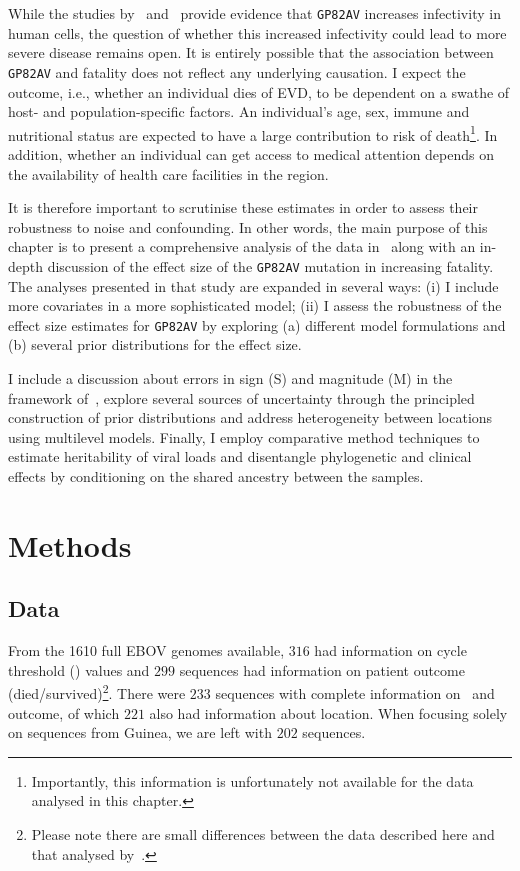 While the studies by~\cite{Urbanowicz2016} and~\cite{Diehl2016} provide evidence that \verb|GP82AV| increases infectivity in human cells, the question of whether this increased infectivity could lead to more severe disease remains open.
It is entirely possible that the association between \verb|GP82AV| and fatality does not reflect any underlying causation.
I expect the outcome, i.e., whether an individual dies of EVD, to be dependent on a swathe of host- and population-specific factors.
An individual's age, sex, immune and nutritional status are expected to have a large contribution to risk of death\footnote{Importantly, this information is unfortunately not available for the data analysed in this chapter.}.
In addition, whether an individual can get access to medical attention depends on the availability of health care facilities in the region.

It is therefore important to scrutinise these estimates in order to assess their robustness to noise and confounding.
In other words, the main purpose of this chapter is to present a comprehensive analysis of the data in~\cite{Diehl2016} along with an in-depth discussion of the effect size of  the \verb|GP82AV| mutation in increasing fatality.
The analyses presented in that study are expanded in several ways: (i) I include more covariates in a more sophisticated model; (ii) I assess the robustness of the effect size estimates for \verb|GP82AV| by exploring (a) different model formulations and (b) several prior distributions for the effect size.

I include a discussion about errors in sign (S) and magnitude (M) in the framework of~\cite{Gelman2014}, explore several sources of uncertainty through the principled construction of prior distributions and address heterogeneity between locations using multilevel models.
Finally, I employ comparative method techniques to estimate heritability of viral loads and disentangle phylogenetic and clinical effects by conditioning on the shared ancestry between the samples.

\section{Methods}

\subsection{Data}

From the 1610 full EBOV genomes available, $316$ had information on cycle threshold (\ct) values and $299$ sequences had information on patient outcome (died/survived)\footnote{Please note there are small differences between the data described here and that analysed by~\cite{Diehl2016}.}.
There were $233$ sequences with complete information on \ct~and outcome, of which $221$ also had information about location.
When focusing solely on sequences from Guinea, we are left with $202$ sequences.

